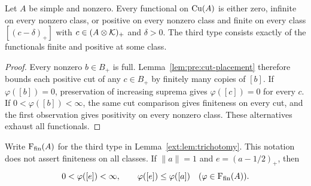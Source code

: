 \begin{lemma}
\label{ext:lem:trichotomy}
Let $A$ be simple and nonzero. Every functional on $\mathrm{Cu}(A)$ is
either zero, infinite on every nonzero class, or positive on every
nonzero class and finite on every class $[(c-\delta)_+]$ with
$c\in(A\otimes\mathcal K)_+$ and $\delta>0$.
The third type consists exactly of the functionals finite and
positive at some class.
\end{lemma}

\begin{proof}
Every nonzero $b\in B_+$ is full. Lemma~\ref{lem:pre:cut-placement}
therefore bounds each positive cut of any $c\in B_+$ by finitely
many copies of $[b]$. If $\varphi([b])=0$, preservation of
increasing suprema gives $\varphi([c])=0$ for every $c$.
If $0<\varphi([b])<\infty$, the same cut comparison gives
finiteness on every cut, and the first observation gives positivity
on every nonzero class. These alternatives exhaust all functionals.
\end{proof}

Write $\mathrm F_{\mathrm{fin}}(A)$ for the third type in
Lemma~\ref{ext:lem:trichotomy}. This notation does not assert finiteness
on all classes. If $\|a\|=1$ and $e=(a-1/2)_+$, then
\begin{equation}
\label{ext:eq:controller}
 0<\varphi([e])<\infty,\qquad
 \varphi([e])\le\varphi([a])
 \quad(\varphi\in\mathrm F_{\mathrm{fin}}(A)).
\end{equation}

